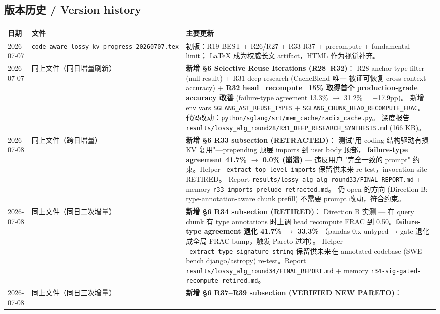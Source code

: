 \documentclass[11pt,a4paper]{article}
\begin{document}
\subsection*{版本历史 / Version history}
\begin{table}[h]
\centering\small
\begin{tabular}{@{}lll@{}}
\toprule
\textbf{日期} & \textbf{文件} & \textbf{主要更新} \\
\midrule
2026-07-07 & \texttt{code\_aware\_lossy\_kv\_progress\_20260707.tex} &
初版：R19 BEST + R26/R27 + R33-R37 + precompute + fundamental limit；
LaTeX 成为权威长文 artifact，HTML 作为视觉补充。 \\
2026-07-07 & 同上文件（同日增量刷新） &
\textbf{新增 §6 Selective Reuse Iterations (R28--R32)}：
R28 anchor-type filter (null result) + R31 deep research (CacheBlend 唯一
被证可恢复 cross-context accuracy) + \textbf{R32 head\_recompute\_15\%
取得首个 production-grade accuracy 改善}
(failure-type agreement 13.3\% $\to$ 31.2\% = +17.9pp)。
新增 env vars \texttt{SGLANG\_AST\_REUSE\_TYPES} + \texttt{SGLANG\_CHUNK\_HEAD\_RECOMPUTE\_FRAC}。
代码改动：\texttt{python/sglang/srt/mem\_cache/radix\_cache.py}。
深度报告 \texttt{results/lossy\_alg\_round28/R31\_DEEP\_RESEARCH\_SYNTHESIS.md} (166 KB)。 \\
2026-07-08 & 同上文件（跨日增量） &
\textbf{新增 §6 R33 subsection (RETRACTED)}：
测试"用 coding 结构驱动有损 KV 复用"---prepending 顶层 imports 到 user body 顶部，
\textbf{failure-type agreement 41.7\% $\to$ 0.0\% (崩溃)} --- 违反用户
"完全一致的 prompt" 约束。Helper \texttt{\_extract\_top\_level\_imports}
保留供未来 re-test，invocation site RETIRED。
Report \texttt{results/lossy\_alg\_alg\_round33/FINAL\_REPORT.md} +
memory \texttt{r33-imports-prelude-retracted.md}。
仍 open 的方向 (Direction B: type-annotation-aware chunk prefill) 不需要
prompt 改动，符合约束。 \\
2026-07-08 & 同上文件（同日二次增量） &
\textbf{新增 §6 R34 subsection (RETIRED)}：
Direction B 实测 --- 在 query chunk 有 type annotations 时上调 head
recompute FRAC 到 0.50。\textbf{failure-type agreement 退化 41.7\% $\to$ 33.3\%}
（pandas 0.x untyped → gate 退化成全局 FRAC bump，触发 Pareto 过冲）。
Helper \texttt{\_extract\_type\_signature\_string} 保留供未来在 annotated
codebase (SWE-bench django/astropy) re-test。Report
\texttt{results/lossy\_alg\_round34/FINAL\_REPORT.md} +
memory \texttt{r34-sig-gated-recompute-retired.md}。 \\
2026-07-08 & 同上文件（同日三次增量） &
\textbf{新增 §6 R37--R39 subsection (VERIFIED NEW PARETO)}：

\end{tabular}
\end{table}
\end{document}
